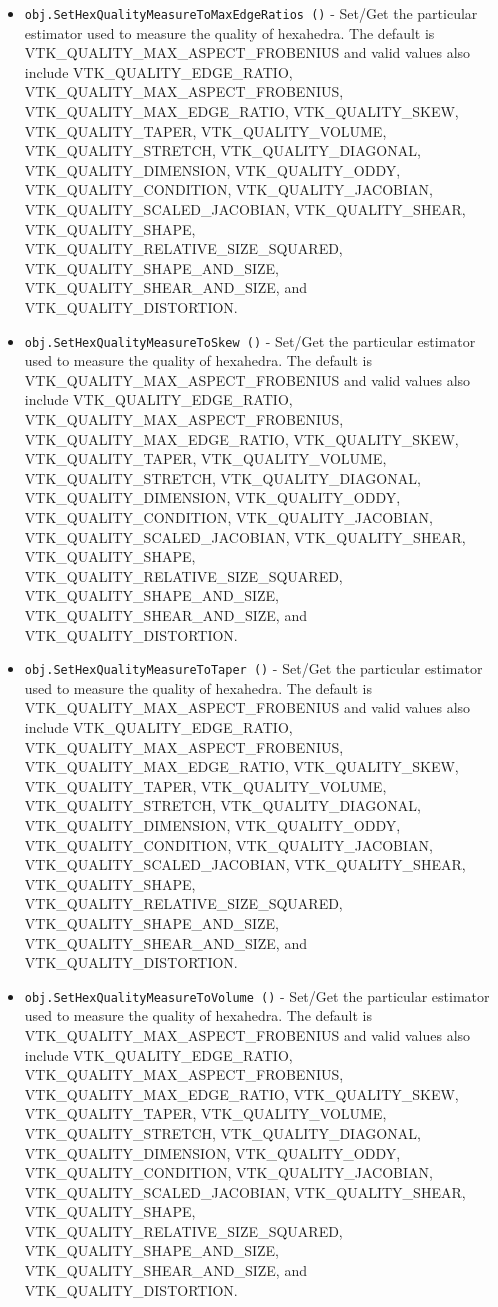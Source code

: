 \begin{itemize}
\item  \verb|obj.SetHexQualityMeasureToMaxEdgeRatios ()| -  Set/Get the particular estimator used to measure the quality of hexahedra.
 The default is VTK\_QUALITY\_MAX\_ASPECT\_FROBENIUS and valid values also include
 VTK\_QUALITY\_EDGE\_RATIO, VTK\_QUALITY\_MAX\_ASPECT\_FROBENIUS, 
 VTK\_QUALITY\_MAX\_EDGE\_RATIO, VTK\_QUALITY\_SKEW, VTK\_QUALITY\_TAPER, VTK\_QUALITY\_VOLUME,
 VTK\_QUALITY\_STRETCH, VTK\_QUALITY\_DIAGONAL, VTK\_QUALITY\_DIMENSION,
 VTK\_QUALITY\_ODDY, VTK\_QUALITY\_CONDITION, VTK\_QUALITY\_JACOBIAN,
 VTK\_QUALITY\_SCALED\_JACOBIAN, VTK\_QUALITY\_SHEAR, VTK\_QUALITY\_SHAPE,
 VTK\_QUALITY\_RELATIVE\_SIZE\_SQUARED, VTK\_QUALITY\_SHAPE\_AND\_SIZE,
 VTK\_QUALITY\_SHEAR\_AND\_SIZE, and VTK\_QUALITY\_DISTORTION.

\item  \verb|obj.SetHexQualityMeasureToSkew ()| -  Set/Get the particular estimator used to measure the quality of hexahedra.
 The default is VTK\_QUALITY\_MAX\_ASPECT\_FROBENIUS and valid values also include
 VTK\_QUALITY\_EDGE\_RATIO, VTK\_QUALITY\_MAX\_ASPECT\_FROBENIUS, 
 VTK\_QUALITY\_MAX\_EDGE\_RATIO, VTK\_QUALITY\_SKEW, VTK\_QUALITY\_TAPER, VTK\_QUALITY\_VOLUME,
 VTK\_QUALITY\_STRETCH, VTK\_QUALITY\_DIAGONAL, VTK\_QUALITY\_DIMENSION,
 VTK\_QUALITY\_ODDY, VTK\_QUALITY\_CONDITION, VTK\_QUALITY\_JACOBIAN,
 VTK\_QUALITY\_SCALED\_JACOBIAN, VTK\_QUALITY\_SHEAR, VTK\_QUALITY\_SHAPE,
 VTK\_QUALITY\_RELATIVE\_SIZE\_SQUARED, VTK\_QUALITY\_SHAPE\_AND\_SIZE,
 VTK\_QUALITY\_SHEAR\_AND\_SIZE, and VTK\_QUALITY\_DISTORTION.

\item  \verb|obj.SetHexQualityMeasureToTaper ()| -  Set/Get the particular estimator used to measure the quality of hexahedra.
 The default is VTK\_QUALITY\_MAX\_ASPECT\_FROBENIUS and valid values also include
 VTK\_QUALITY\_EDGE\_RATIO, VTK\_QUALITY\_MAX\_ASPECT\_FROBENIUS, 
 VTK\_QUALITY\_MAX\_EDGE\_RATIO, VTK\_QUALITY\_SKEW, VTK\_QUALITY\_TAPER, VTK\_QUALITY\_VOLUME,
 VTK\_QUALITY\_STRETCH, VTK\_QUALITY\_DIAGONAL, VTK\_QUALITY\_DIMENSION,
 VTK\_QUALITY\_ODDY, VTK\_QUALITY\_CONDITION, VTK\_QUALITY\_JACOBIAN,
 VTK\_QUALITY\_SCALED\_JACOBIAN, VTK\_QUALITY\_SHEAR, VTK\_QUALITY\_SHAPE,
 VTK\_QUALITY\_RELATIVE\_SIZE\_SQUARED, VTK\_QUALITY\_SHAPE\_AND\_SIZE,
 VTK\_QUALITY\_SHEAR\_AND\_SIZE, and VTK\_QUALITY\_DISTORTION.

\item  \verb|obj.SetHexQualityMeasureToVolume ()| -  Set/Get the particular estimator used to measure the quality of hexahedra.
 The default is VTK\_QUALITY\_MAX\_ASPECT\_FROBENIUS and valid values also include
 VTK\_QUALITY\_EDGE\_RATIO, VTK\_QUALITY\_MAX\_ASPECT\_FROBENIUS, 
 VTK\_QUALITY\_MAX\_EDGE\_RATIO, VTK\_QUALITY\_SKEW, VTK\_QUALITY\_TAPER, VTK\_QUALITY\_VOLUME,
 VTK\_QUALITY\_STRETCH, VTK\_QUALITY\_DIAGONAL, VTK\_QUALITY\_DIMENSION,
 VTK\_QUALITY\_ODDY, VTK\_QUALITY\_CONDITION, VTK\_QUALITY\_JACOBIAN,
 VTK\_QUALITY\_SCALED\_JACOBIAN, VTK\_QUALITY\_SHEAR, VTK\_QUALITY\_SHAPE,
 VTK\_QUALITY\_RELATIVE\_SIZE\_SQUARED, VTK\_QUALITY\_SHAPE\_AND\_SIZE,
 VTK\_QUALITY\_SHEAR\_AND\_SIZE, and VTK\_QUALITY\_DISTORTION.


\end{itemize}
